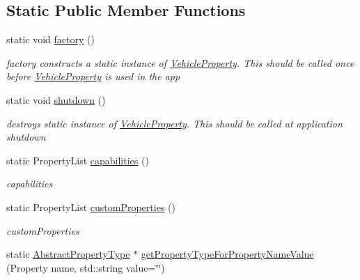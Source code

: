 \subsection*{Static Public Member Functions}
\begin{DoxyCompactItemize}
\item 
\hypertarget{classVehicleProperty_a528c8e2ee75036f6e50c0121f4184fa2}{static void \hyperlink{classVehicleProperty_a528c8e2ee75036f6e50c0121f4184fa2}{factory} ()}\label{classVehicleProperty_a528c8e2ee75036f6e50c0121f4184fa2}

\begin{DoxyCompactList}\small\item\em factory constructs a static instance of \hyperlink{classVehicleProperty}{Vehicle\-Property}. This should be called once before \hyperlink{classVehicleProperty}{Vehicle\-Property} is used in the app \end{DoxyCompactList}\item 
\hypertarget{classVehicleProperty_af774bc8bf04295c7bcac0e6b68f14a8f}{static void \hyperlink{classVehicleProperty_af774bc8bf04295c7bcac0e6b68f14a8f}{shutdown} ()}\label{classVehicleProperty_af774bc8bf04295c7bcac0e6b68f14a8f}

\begin{DoxyCompactList}\small\item\em destroys static instance of \hyperlink{classVehicleProperty}{Vehicle\-Property}. This should be called at application shutdown \end{DoxyCompactList}\item 
static Property\-List \hyperlink{classVehicleProperty_a3a98f69c977cad98a31f4dfc998d8668}{capabilities} ()
\begin{DoxyCompactList}\small\item\em capabilities \end{DoxyCompactList}\item 
static Property\-List \hyperlink{classVehicleProperty_a5b4e3efd4a48d34e0c9a6eef2bfcbfdc}{custom\-Properties} ()
\begin{DoxyCompactList}\small\item\em custom\-Properties \end{DoxyCompactList}\item 
\hypertarget{classVehicleProperty_a60e654875a0d5901af8ab2d3dc596472}{static \hyperlink{classAbstractPropertyType}{Abstract\-Property\-Type} $\ast$ \hyperlink{classVehicleProperty_a60e654875a0d5901af8ab2d3dc596472}{get\-Property\-Type\-For\-Property\-Name\-Value} (Property name, std\-::string value=\char`\"{}\char`\"{})}\label{classVehicleProperty_a60e654875a0d5901af8ab2d3dc596472}


\end{DoxyCompactItemize}
